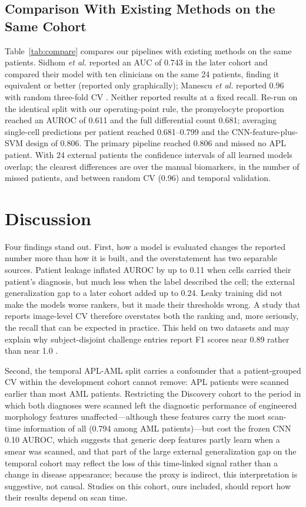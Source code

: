 \documentclass[journal]{IEEEtran}
\begin{document}
\subsection{Comparison With Existing Methods on the Same Cohort}
Table~\ref{tab:compare} compares our pipelines with existing methods on the same patients. Sidhom \emph{et al.} reported an AUC of 0.743 in the later cohort \cite{sidhom2021apl} and compared their model with ten clinicians on the same 24 patients, finding it equivalent or better (reported only graphically); Manescu \emph{et al.} reported 0.96 with random three-fold CV \cite{manescu2023apl}. Neither reported results at a fixed recall. Re-run on the identical split with our operating-point rule, the promyelocyte proportion reached an AUROC of 0.611 and the full differential count 0.681; averaging single-cell predictions per patient \cite{sidhom2021apl} reached 0.681--0.799 and the CNN-feature-plus-SVM design of \cite{kasim2025multiclass} 0.806. The primary pipeline reached 0.806 and missed no APL patient. With 24 external patients the confidence intervals of all learned models overlap; the clearest differences are over the manual biomarkers, in the number of missed patients, and between random CV (0.96) and temporal validation.



\section{Discussion}
Four findings stand out. First, how a model is evaluated changes the reported number more than how it is built, and the overstatement has two separable sources. Patient leakage inflated AUROC by up to 0.11 when cells carried their patient's diagnosis, but much less when the label described the cell; the external generalization gap to a later cohort added up to 0.24. Leaky training did not make the models worse rankers, but it made their thresholds wrong. A study that reports image-level CV therefore overstates both the ranking and, more seriously, the recall that can be expected in practice. This held on two datasets and may explain why subject-disjoint challenge entries report F1 scores near 0.89 rather than near 1.0 \cite{prellberg2019cnmc,mondal2021ensemble}.

Second, the temporal APL-AML split carries a confounder that a patient-grouped CV within the development cohort cannot remove: APL patients were scanned earlier than most AML patients. Restricting the Discovery cohort to the period in which both diagnoses were scanned left the diagnostic performance of engineered morphology features unaffected---although these features carry the most scan-time information of all (0.794 among AML patients)---but cost the frozen CNN 0.10 AUROC, which suggests that generic deep features partly learn when a smear was scanned, and that part of the large external generalization gap on the temporal cohort may reflect the loss of this time-linked signal rather than a change in disease appearance; because the proxy is indirect, this interpretation is suggestive, not causal. Studies on this cohort, ours included, should report how their results depend on scan time.
\end{document}
